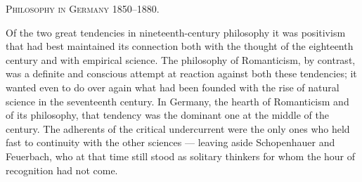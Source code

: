 \documentclass[12pt,a4paper]{book}
\newcommand{\opage}[1]{\marginnote{\footnotesize\textit{[#1]}}}
\begin{document}
\begin{center}\textsc{Philosophy in Germany 1850--1880.}\end{center}

\bigskip

\noindent \opage{493}Of the two great tendencies in nineteenth-century philosophy it was
positivism that had best maintained its connection both with the thought of the
eighteenth century and with empirical science. The philosophy of Romanticism, by
contrast, was a definite and conscious attempt at reaction against both these
tendencies; it wanted even to do over again what had been founded with the rise
of natural science in the seventeenth century. In Germany, the hearth of
Romanticism and of its philosophy, that tendency was the dominant one at the
middle of the century. The adherents of the critical undercurrent were the only
ones who held fast to continuity with the other sciences --- leaving aside
Schopenhauer and Feuerbach, who at that time still stood as solitary thinkers
for whom the hour of recognition had not come.
\end{document}
